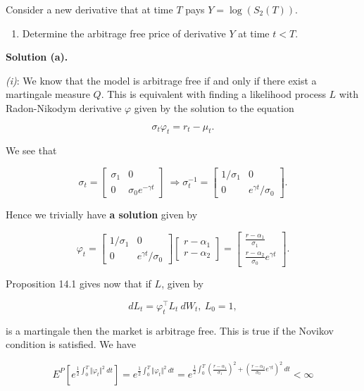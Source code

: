 \documentclass[a4paper,12pt,openany]{book}
\providecommand{\tightlist}{%
 \setlength{\itemsep}{0pt}\setlength{\parskip}{0pt}}
\begin{document}
Consider a new derivative that at time \(T\) pays \(Y=\log(S_2(T))\).

\begin{enumerate}
\def\labelenumi{\alph{enumi}.}
\setcounter{enumi}{2}
\tightlist
\item
  Determine the arbitrage free price of derivative \(Y\) at time \(t<T\).
\end{enumerate}

\textbf{Solution (a).}

\emph{(i)}: We know that the model is arbitrage free if and only if there exist a martingale measure \(Q\). This is equivalent with finding a likelihood process \(L\) with Radon-Nikodym derivative \(\varphi\) given by the solution to the equation

\[
\sigma_t\varphi_t=r_t-\mu_t.
\]

We see that

\[
\sigma_t=
\begin{bmatrix}
\sigma_1 & 0\\
0 & \sigma_0e^{-\gamma t}
\end{bmatrix}\ \Rightarrow
\sigma_t^{-1}=
\begin{bmatrix}
1/\sigma_1 & 0\\
0 & e^{\gamma t}/\sigma_0
\end{bmatrix}.
\]

Hence we trivially have \textbf{a solution} given by

\[
\varphi_t=\begin{bmatrix}
1/\sigma_1 & 0\\
0 & e^{\gamma t}/\sigma_0
\end{bmatrix}\begin{bmatrix}
r-\alpha_1\\
r-\alpha_2
\end{bmatrix}=\begin{bmatrix}
\frac{r-\alpha_1}{\sigma_1}\\
\frac{r-\alpha_2}{\sigma_0}e^{\gamma t}
\end{bmatrix}.
\]

Proposition 14.1 gives now that if \(L\), given by

\[
dL_t=\varphi_t^\top L_t\ dW_t,\ L_0=1,
\]

is a martingale then the market is arbitrage free. This is true if the Novikov condition is satisfied. We have

\[
E^P\left[e^{\frac{1}{2}\int_0^T\Vert\varphi_t\Vert^2\ dt}\right]=e^{\frac{1}{2}\int_0^T\Vert\varphi_t\Vert^2\ dt}= e^{\frac{1}{2}\int_0^T(\frac{r-\alpha_1}{\sigma_1})^2+(\frac{r-\alpha_2}{\sigma_0}e^{\gamma t})^2\ dt}<\infty
\]
\end{document}
